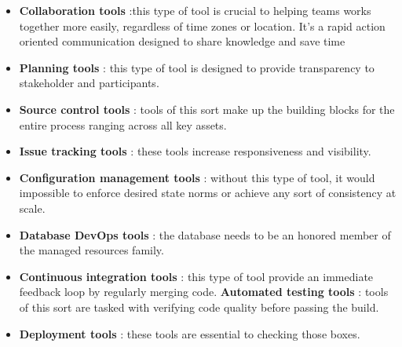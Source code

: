 \documentclass[11pt]{article}
\begin{document}
\begin{itemize}
\item \textbf{Collaboration tools} :this type of tool is crucial to helping teams works together more easily, regardless of time zones or location. It's a rapid action oriented communication designed to share knowledge and save time
\item \textbf{Planning tools} : this type of tool is designed to provide transparency to stakeholder and participants.
\item \textbf{Source control tools} : tools of this sort make up the building blocks for the entire process ranging across all key assets.
\item \textbf{Issue tracking tools} : these tools increase responsiveness and visibility.
\item \textbf{Configuration management tools} : without this type of tool, it would impossible to enforce desired state norms or achieve any sort of consistency at scale.
\item \textbf{Database DevOps tools} : the database needs to be an honored member of the managed resources family.
\item \textbf{Continuous integration tools} : this type of tool provide an immediate feedback loop by regularly merging code.
\textbf{Automated testing tools} :  tools of this sort are tasked with verifying code quality before passing the build.
\item \textbf{Deployment tools} : these tools are essential to checking those boxes.
\end{itemize}
\end{document}
